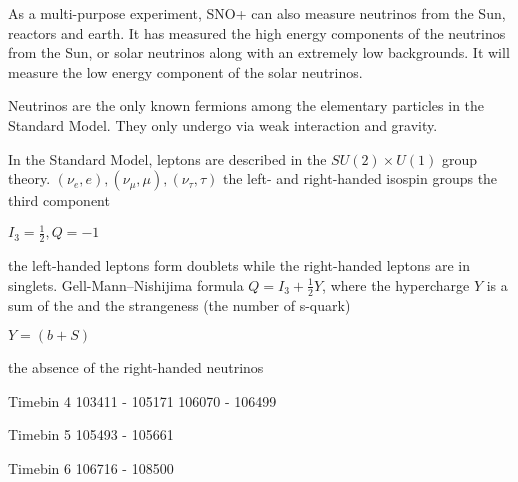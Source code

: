 
As a multi-purpose experiment, SNO+ can also measure neutrinos from the Sun, reactors and earth. It has measured the high energy components of the neutrinos from the Sun, or solar neutrinos along with an extremely low backgrounds. It will measure the low energy component of the solar neutrinos.


Neutrinos are the only known fermions among the elementary particles in the Standard Model. They only undergo via weak interaction and gravity. 

In the Standard Model, leptons are described in the $SU(2)\times U(1)$ group theory.
$(\nu_e,e),(\nu_\mu,\mu),(\nu_\tau,\tau)$
the left- and right-handed isospin groups
the third component

$I_3=\frac{1}{2},Q=-1$

the left-handed leptons form doublets while the right-handed leptons are in singlets.
Gell-Mann–Nishijima formula $Q=I_3+\frac{1}{2}Y$, where the hypercharge $Y$ is a sum of the and the strangeness (the number of s-quark)

$Y=(b+S)$


the absence of the right-handed neutrinos 


Timebin 4
103411 - 105171
106070 - 106499

Timebin 5
105493 - 105661

Timebin 6
106716 - 108500










